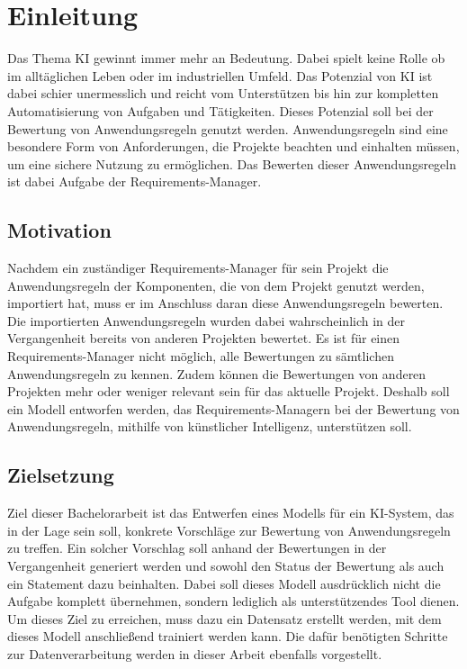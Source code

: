 \chapter{Einleitung}
\label{chap:einleitung}
Das Thema \ac{KI} gewinnt immer mehr an Bedeutung. Dabei spielt keine Rolle ob im alltäglichen Leben oder im industriellen Umfeld. Das Potenzial von \ac{KI} ist dabei 
schier unermesslich und reicht vom Unterstützen bis hin zur kompletten Automatisierung von Aufgaben und Tätigkeiten. Dieses Potenzial soll bei der Bewertung von Anwendungsregeln genutzt werden.
Anwendungsregeln sind eine besondere Form von Anforderungen, die Projekte beachten und einhalten müssen, um eine sichere Nutzung zu ermöglichen.
Das Bewerten dieser Anwendungsregeln ist dabei Aufgabe der Requirements-Manager.  

\section{Motivation}
\label{chap:Motivation}
Nachdem ein zuständiger Requirements-Manager für sein Projekt die Anwendungsregeln der Komponenten, die von dem Projekt genutzt werden, importiert hat, muss er im Anschluss daran
diese Anwendungsregeln bewerten. Die importierten Anwendungsregeln wurden dabei wahrscheinlich in der Vergangenheit bereits von anderen Projekten bewertet. 
Es ist für einen Requirements-Manager nicht möglich, alle Bewertungen zu sämtlichen Anwendungsregeln zu kennen. Zudem können die Bewertungen von anderen Projekten mehr oder weniger relevant 
sein für das aktuelle Projekt. Deshalb soll ein Modell entworfen werden, das Requirements-Managern bei der Bewertung von Anwendungsregeln, mithilfe von künstlicher Intelligenz, unterstützen soll.

\section{Zielsetzung}
\label{chap:Zielsetzung}
Ziel dieser Bachelorarbeit ist das Entwerfen eines Modells für ein \ac{KI}-System, das in der Lage sein soll, konkrete Vorschläge zur Bewertung von Anwendungsregeln zu treffen.
Ein solcher Vorschlag soll anhand der Bewertungen in der Vergangenheit generiert werden und sowohl den Status der Bewertung als auch ein Statement dazu beinhalten.
Dabei soll dieses Modell ausdrücklich nicht die Aufgabe komplett übernehmen, sondern lediglich als unterstützendes Tool dienen. 
Um dieses Ziel zu erreichen, muss dazu ein Datensatz erstellt werden, mit dem dieses Modell anschließend trainiert werden kann. Die dafür benötigten Schritte zur 
Datenverarbeitung werden in dieser Arbeit ebenfalls vorgestellt. 

